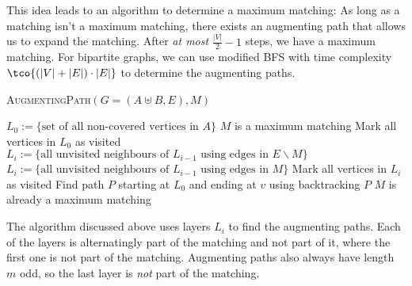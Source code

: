 This idea leads to an algorithm to determine a maximum matching: As long as a matching isn't a maximum matching, there exists an augmenting path that allows us to expand the matching. After \textit{at most} $\frac{|V|}{2} - 1$ steps, we have a maximum matching. For bipartite graphs, we can use modified BFS with time complexity $\tco{(|V| + |E|) \cdot |E|}$ to determine the augmenting paths.
\begin{algorithm}
    \caption{\textsc{AugmentingPath}$(G = (A \uplus B, E), M)$}
    \begin{algorithmic}[1]
        \State $L_0 := \{ \text{set of all non-covered vertices in $A$} \}$
            \State \Return $M$ is a maximum matching
        \EndIf
        \State Mark all vertices in $L_0$ as visited
             
                \State $L_i := \{\text{all unvisited neighbours of $L_{i - 1}$ using edges in } E \backslash M\}$
            \Else
                \State $L_i := \{\text{all unvisited neighbours of $L_{i - 1}$ using edges in } M\}$
            \EndIf
            \State Mark all vertices in $L_i$ as visited 
                \State Find path $P$ starting at $L_0$ and ending at $v$ using backtracking
                \State \Return $P$
            \EndIf
        \EndFor
        \State \Return $M$ is already a maximum matching
    \end{algorithmic}
\end{algorithm}
\begin{center}
\end{center}
The algorithm discussed above uses layers $L_i$ to find the augmenting paths. Each of the layers is alternatingly part of the matching and not part of it, where the first one is not part of the matching. Augmenting paths also always have length $m$ odd, so the last layer is \textit{not} part of the matching.



